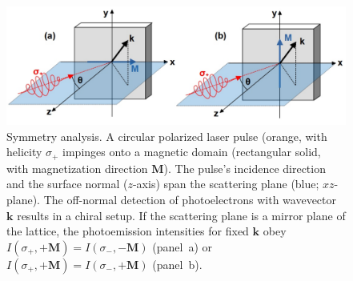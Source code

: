 \documentclass[prl,twocolumn,floatfix]{revtex4-2}
\renewcommand{\vec}[1]{\boldsymbol{#1}}
\begin{document}
\begin{figure}
    \centering
    \includegraphics[width = \columnwidth]{symmetry}
    \caption{Symmetry analysis. A circular polarized laser pulse (orange, with helicity $\sigma_{+}$ impinges onto a magnetic domain (rectangular solid, with magnetization direction $\vec{M}$). The pulse's incidence direction and the surface normal ($z$-axis) span the scattering plane (blue; $xz$-plane). The off-normal detection of photoelectrons with wavevector $\vec{k}$ results in a chiral setup. If the scattering plane is a mirror plane of the lattice, the photoemission intensities for fixed $\vec{k}$ obey $I(\sigma_{+}, +\vec{M}) = I(\sigma_{-}, -\vec{M})$ (panel~a) or $I(\sigma_{+}, +\vec{M}) = I(\sigma_{-}, +\vec{M})$ (panel~b).}
    \label{fig:symmetry}
\end{figure}
\end{document}
